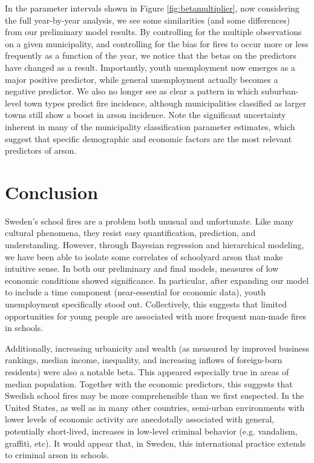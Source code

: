 \documentclass[10pt,a4paper, hidelinks]{article} %
\begin{document}
In the parameter intervals shown in Figure \ref{fig:betamultiplier}, now considering the full year-by-year analysis, we see some similarities (and some differences) from our preliminary model results. By controlling for the multiple observations on a given municipality, and controlling for the bias for fires to occur more or less frequently as a function of the year, we notice that the betas on the predictors have changed as a result. Importantly, youth unemployment now emerges as a major positive predictor, while general unemployment actually becomes a negative predictor. We also no longer see as clear a pattern in which suburban-level town types predict fire incidence, although municipalities classified as larger towns still show a boost in arson incidence. Note the significant uncertainty inherent in many of the municipality classification parameter estimates, which suggest that specific demographic and economic factors are the most relevant predictors of arson.


\section{Conclusion}
Sweden's school fires are a problem both unusual and unfortunate.  Like many cultural phenomena, they resist easy quantification, prediction, and understanding.  However, through Bayesian regression and hierarchical modeling, we have been able to isolate some correlates of schoolyard arson that make intuitive sense.  In both our preliminary and final models, measures of low economic conditions showed significance.  In particular, after expanding our model to include a time component (near-essential for economic data), youth unemployment specifically stood out.  Collectively, this suggests that limited opportunities for young people are associated with more frequent man-made fires in schools.

Additionally, increasing urbanicity and wealth (as measured by improved business rankings, median income, inequality, and increasing inflows of foreign-born residents) were also a notable beta.  This appeared especially true in areas of median population.  Together with the economic predictors, this suggests that Swedish school fires may be more comprehensible than we first suspected.  In the United States, as well as in many other countries, semi-urban environments with lower levels of economic activity are anecdotally associated with general, potentially short-lived, increases in low-level criminal behavior (e.g. vandalism, graffiti, etc).  It would appear that, in Sweden, this international practice extends to criminal arson in schools.
\end{document}
